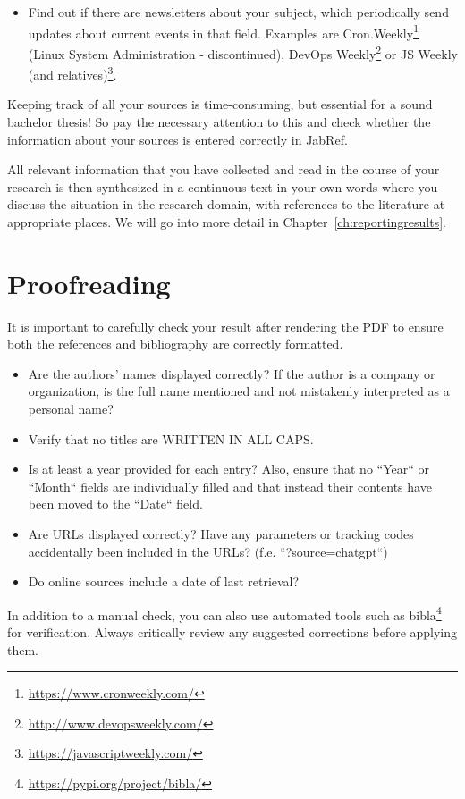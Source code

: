\begin{itemize}
  \item Find out if there are newsletters about your subject, which periodically send updates about current events in that field. Examples are Cron.Weekly\footnote{\url{https://www.cronweekly.com/}} (Linux System Administration - discontinued), DevOps Weekly\footnote{\url{http://www.devopsweekly.com/}} or JS Weekly (and relatives)\footnote{\url{https://javascriptweekly.com/}}.
\end{itemize}

Keeping track of all your sources is time-consuming, but essential for a sound bachelor thesis! So pay the necessary attention to this and check whether the information about your sources is entered correctly in JabRef.

All relevant information that you have collected and read in the course of your research is then synthesized in a continuous text in your own words where you discuss the situation in the research domain, with references to the literature at appropriate places. We will go into more detail in Chapter~\ref{ch:reportingresults}.

\section{Proofreading}
\label{sec:bibliography-proofreading}

It is important to carefully check your result after rendering the PDF to ensure both the references and bibliography are correctly formatted.

\begin{itemize}
	\item Are the authors' names displayed correctly? If the author is a company or organization, is the full name mentioned and not mistakenly interpreted as a personal name?
	\item Verify that no titles are WRITTEN IN ALL CAPS.
	\item Is at least a year provided for each entry? Also, ensure that no ``Year`` or ``Month`` fields are individually filled and that instead their contents have been moved to the ``Date`` field.
	\item Are URLs displayed correctly? Have any parameters or tracking codes accidentally been included in the URLs? (f.e. ``?source=chatgpt``)
	\item Do online sources include a date of last retrieval?
	\end{itemize}

In addition to a manual check, you can also use automated tools such as bibla\footnote{\url{https://pypi.org/project/bibla/}} for verification. Always critically review any suggested corrections before applying them.

